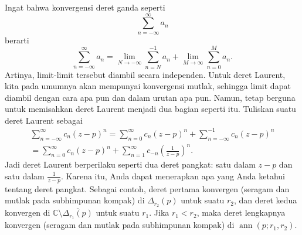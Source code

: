 \documentclass[12pt,openany]{book}
\newcommand{\ann}{\operatorname{ann}}
\newcommand{\C}{{\mathbb{C}}}
\theoremstyle{plain}
\theoremstyle{remark}
\theoremstyle{definition}
\theoremstyle{exercise}
\theoremstyle{example}
\begin{document}
Ingat bahwa konvergensi deret ganda seperti
\begin{equation*}
\sum_{n=-\infty}^{\infty} a_n
\end{equation*}
berarti
\begin{equation*}
\sum_{n=-\infty}^{\infty} a_n
=
\lim_{N\to -\infty}
\sum_{n=N}^{-1} a_n
+
\lim_{M\to \infty}
\sum_{n=0}^{M} a_n .
\end{equation*}
Artinya, limit-limit tersebut diambil secara independen.
Untuk deret Laurent,
kita pada umumnya akan mempunyai konvergensi mutlak,
sehingga limit dapat diambil dengan cara apa pun
dan dalam urutan apa pun.
Namun, tetap berguna untuk memisahkan deret Laurent menjadi dua
bagian seperti itu.
Tuliskan suatu deret Laurent sebagai 
\begin{multline*}
\sum_{n=-\infty}^{\infty} c_n {(z-p)}^n
=
\sum_{n=0}^{\infty} c_n {(z-p)}^n
+
\sum_{n=-\infty}^{-1} c_n {(z-p)}^n
\\
=
\sum_{n=0}^{\infty} c_n {(z-p)}^n
+
\sum_{n=1}^{\infty} c_{-n} {\left(\frac{1}{z-p}\right)}^n .
\end{multline*}
Jadi deret Laurent berperilaku seperti dua deret pangkat: satu dalam $z-p$ dan satu
dalam $\frac{1}{z-p}$. Karena itu, Anda dapat menerapkan apa yang Anda ketahui tentang deret
pangkat. Sebagai contoh, deret pertama konvergen (seragam dan mutlak pada subhimpunan kompak) di $\Delta_{r_2}(p)$
untuk suatu $r_2$,
dan deret kedua konvergen di $\C \setminus \overline{\Delta_{r_1}(p)}$
untuk suatu $r_1$.
Jika $r_1 < r_2$, maka deret lengkapnya konvergen
(seragam dan mutlak pada subhimpunan kompak)
di $\ann(p;r_1,r_2)$.
\end{document}
